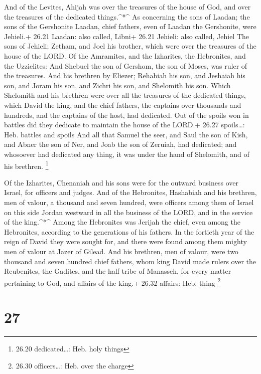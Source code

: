  And of the Levites, Ahijah was over the treasures of the
house of God, and over the treasures of the dedicated things.\^{}*\^{}
 As concerning the sons of Laadan; the sons of the
Gershonite Laadan, chief fathers, even of Laadan the Gershonite, were
Jehieli.+ 26.21 Laadan: also called, Libni+ 26.21 Jehieli: also called,
Jehiel  The sons of Jehieli; Zetham, and Joel his brother,
which were over the treasures of the house of the LORD.  Of
the Amramites, and the Izharites, the Hebronites, and the Uzzielites:
 And Shebuel the son of Gershom, the son of Moses, was
ruler of the treasures.  And his brethren by Eliezer;
Rehabiah his son, and Jeshaiah his son, and Joram his son, and Zichri
his son, and Shelomith his son.  Which Shelomith and his
brethren were over all the treasures of the dedicated things, which
David the king, and the chief fathers, the captains over thousands and
hundreds, and the captains of the host, had dedicated.  Out
of the spoils won in battles did they dedicate to maintain the house of
the LORD.+ 26.27 spoils\ldots: Heb. battles and spoils  And
all that Samuel the seer, and Saul the son of Kish, and Abner the son of
Ner, and Joab the son of Zeruiah, had dedicated; and whosoever had
dedicated any thing, it was under the hand of Shelomith, and of his
brethren. \footnote{26.20 dedicated\ldots: Heb. holy things}

 Of the Izharites, Chenaniah and his sons were for the
outward business over Israel, for officers and judges.  And
of the Hebronites, Hashabiah and his brethren, men of valour, a thousand
and seven hundred, were officers among them of Israel on this side
Jordan westward in all the business of the LORD, and in the service of
the king.\^{}*\^{}  Among the Hebronites was Jerijah the
chief, even among the Hebronites, according to the generations of his
fathers. In the fortieth year of the reign of David they were sought
for, and there were found among them mighty men of valour at Jazer of
Gilead.  And his brethren, men of valour, were two thousand
and seven hundred chief fathers, whom king David made rulers over the
Reubenites, the Gadites, and the half tribe of Manasseh, for every
matter pertaining to God, and affairs of the king.+ 26.32 affairs: Heb.
thing \footnote{26.30 officers\ldots: Heb. over the charge}

\hypertarget{section-26}{%
\section{27}\label{section-26}}

